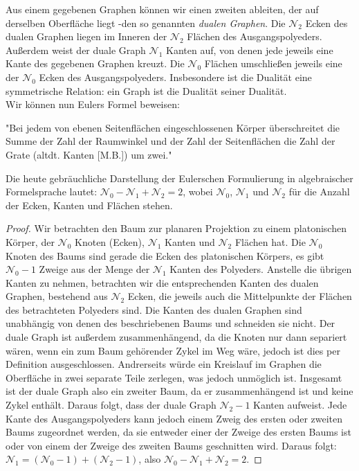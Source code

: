 Aus einem gegebenen Graphen können wir einen zweiten ableiten, der auf derselben Oberfläche liegt -den so genannten \textit{dualen Graphen}. 
Die $\mathcal{N}_2$ Ecken des dualen Graphen liegen im Inneren der $\mathcal{N}_2$ Flächen des Ausgangspolyeders. Außerdem weist der duale Graph $\mathcal{N}_1$ Kanten auf, von denen jede jeweils eine Kante des gegebenen Graphen kreuzt. Die $\mathcal{N}_0$ Flächen umschließen jeweils eine der $\mathcal{N}_0$ Ecken des Ausgangspolyeders. Insbesondere ist die Dualität eine symmetrische Relation: ein Graph ist die Dualität seiner Dualität.\\ 
Wir können nun Eulers Formel beweisen: 
\begin{theorem} 
"Bei jedem von ebenen Seitenflächen eingeschlossenen Körper überschreitet die Summe der Zahl der Raumwinkel und der Zahl der Seitenflächen die Zahl der Grate (altdt. Kanten [M.B.]) um zwei."
\end{theorem}
Die heute gebräuchliche Darstellung der Eulerschen Formulierung in algebraischer Formelsprache lautet:
$\mathcal{N}_0 - \mathcal{N}_1 + \mathcal{N}_2 =2 $, wobei $\mathcal{N}_0$, $\mathcal{N}_1$ und $\mathcal{N}_2$ für die Anzahl der Ecken, Kanten und Flächen stehen.
\begin{proof}
Wir betrachten den Baum zur planaren Projektion zu einem platonischen Körper, der $\mathcal{N}_0$ Knoten (Ecken), $\mathcal{N}_1$ Kanten und $\mathcal{N}_2$ Flächen hat. Die $\mathcal{N}_0$ Knoten des Baums sind gerade die Ecken des platonischen Körpers, es gibt $\mathcal{N}_0 -1$ Zweige aus der Menge der $\mathcal{N}_1$ Kanten des Polyeders. Anstelle die übrigen Kanten zu nehmen, betrachten wir die entsprechenden Kanten des dualen Graphen, bestehend aus $\mathcal{N}_2$ Ecken, die jeweils auch die Mittelpunkte der Flächen des betrachteten Polyeders sind. Die Kanten des dualen Graphen sind unabhängig von denen des beschriebenen Baums und schneiden sie nicht. Der duale Graph ist außerdem zusammenhängend, da die Knoten nur dann separiert wären, wenn ein zum Baum gehörender Zykel im Weg wäre, jedoch ist dies per Definition ausgeschlossen. Andrerseits würde ein Kreislauf im Graphen die Oberfläche in zwei separate Teile zerlegen, was jedoch unmöglich ist. Insgesamt ist der duale Graph also ein zweiter Baum, da er zusammenhängend ist und keine Zykel enthält. Daraus folgt, dass der duale Graph $\mathcal{N}_2-1$ Kanten aufweist. Jede Kante des Ausgangspolyeders kann jedoch einem Zweig des ersten oder zweiten Baums zugeordnet werden, da sie entweder einer der Zweige des ersten Baums ist oder von einem der Zweige des zweiten Baums geschnitten wird. Daraus folgt: $\mathcal{N}_1 = (\mathcal{N}_0-1) + (\mathcal{N}_2-1)$, also $\mathcal{N}_0 - \mathcal{N}_1 + \mathcal{N}_2 =2 $. 
\end{proof}
